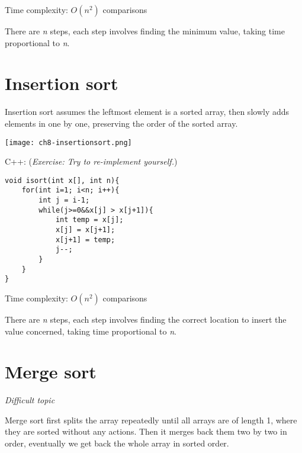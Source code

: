 Time complexity: $O(n^2)$ comparisons
\vspace{6mm}

There are \textit{n} steps, each step involves finding the minimum value, taking time proportional to \textit{n}.

\pagebreak

\section{Insertion sort}

Insertion sort assumes the leftmost element is a sorted array, then slowly adds elements in one by one, preserving the order of the sorted array.

\texttt{[image: ch8-insertionsort.png]}



\pagebreak

C++: (\textit{Exercise: Try to re-implement yourself.})
\begin{lstlisting}
void isort(int x[], int n){
    for(int i=1; i<n; i++){
        int j = i-1;
        while(j>=0&&x[j] > x[j+1]){
            int temp = x[j];
            x[j] = x[j+1];
            x[j+1] = temp;
            j--;
        }
    }
}
\end{lstlisting}

Time complexity: $O(n^2)$ comparisons
\vspace{6mm}

There are \textit{n} steps, each step involves finding the correct location to insert the value concerned, taking time proportional to \textit{n}.

\pagebreak

\section{Merge sort}

\textit{Difficult topic}
\vspace{6mm}

Merge sort first splits the array repeatedly until all arrays are of length 1, where they are sorted without any actions. Then it merges back them two by two in order, eventually we get back the whole array in sorted order.

